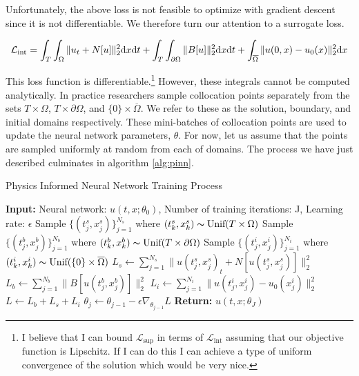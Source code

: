 \documentclass[12pt]{article}
\def\t{\text}
\begin{document}
\noindent Unfortunately, the above loss is not feasible to optimize with gradient descent since it is not differentiable. We therefore turn our attention to a surrogate loss.

\begin{equation} \label{eq:Lint}
    \mathcal{L_{\t{int}}} = \int_{T} \int_{\Omega} \| u_t + N[u] \|_2^2 \t dx \t dt + \int_{T} \int_{\partial \Omega} \|B[u] \|_2^2 \t dx \t dt + \int_{\overline{\Omega}} \|u(0,x) - u_0(x) \|_2^2 \t dx
\end{equation} 

\noindent This loss function is differentiable.\footnote{I believe that I can bound $\mathcal{L}_{\t{sup}}$ in terms of $\mathcal{L}_{\t{int}}$ assuming that our objective function is Lipschitz. If I can do this I can achieve a type of uniform convergence of the solution which would be very nice.} However, these integrals cannot be computed analytically. In practice researchers sample collocation points separately from the sets $T \times \Omega$, $T \times \partial \Omega$, and $\{0\} \times \overline{\Omega}$. We refer to these as the solution, boundary, and initial domains respectively. These mini-batches of collocation points are used to update the neural network parameters, $\theta$. For now, let us assume that the points are sampled uniformly at random from each of domains. The process we have just described culminates in algorithm \ref{alg:pinn}. 

\begin{algorithm}
\caption{Physics Informed Neural Network Training Process}\label{alg:pinn}
\begin{algorithmic}
    \State \textbf{Input:} Neural network: $u(t,x;\theta_0)$, Number of training iterations: J, Learning rate: $\epsilon$
    \State Sample $\{(t^s_j,x^s_j)\}_{j=1}^{N_s}$ where $(t^s_k,x^s_k) \thicksim \t{Unif}(T \times \Omega)$ 
    \State Sample $\{(t^b_j,x^b_j)\}_{j=1}^{N_b}$ where $(t^b_k,x^b_k) \thicksim \t{Unif}(T \times \partial \Omega)$ 
    \State Sample $\{(t^i_j,x^i_j)\}_{j=1}^{N_i}$ where $(t^i_k,x^i_k) \thicksim \t{Unif}(\{0\} \times \overline{\Omega})$ 
    \State $L_s \gets \sum_{j=1}^{N_s} \| u(t^s_j,x^s_j)_t + N[u(t^s_j,x^s_j)] \|_2^2$ 
    \State $L_b \gets \sum_{j=1}^{N_b} \| B[u(t^b_j,x^b_j)] \|_2^2$ 
    \State $L_i \gets \sum_{j=1}^{N_i} \| u(t^i_j,x^i_j) - u_0(x^i_j) \|_2^2$ 
    \State $L \gets L_b + L_s + L_i$
    \State $\theta_j \gets \theta_{j-1} - \epsilon \nabla_{\theta_{j-1}} L$
    \EndFor
    \State \textbf{Return:} $u(t,x;\theta_J)$
\end{algorithmic}
\end{algorithm}
\end{document}
